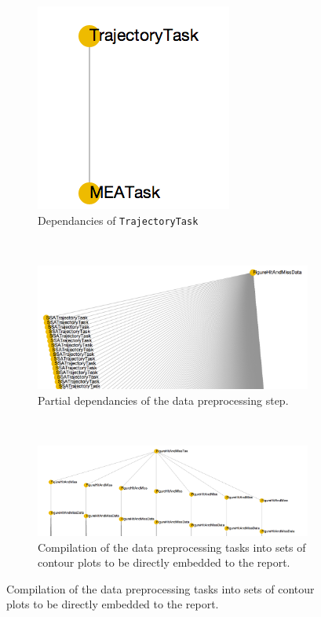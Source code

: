 \begin{figure}
    \centering
     \begin{subfigure}[t]{0.3\textwidth}
        \includegraphics[scale=0.7]{images/TrajectoryTask.png}
        \caption{Dependancies of {\tt TrajectoryTask}}
        \label{fig:pipes_example:TrajectoryTask}
    \end{subfigure}
    ~
    \begin{subfigure}[t]{\textwidth}
        \includegraphics[width=\textwidth]{images/FigureHitAndMissData}
        \caption{Partial dependancies of the data preprocessing step.}
        \label{fig:pipes_example:FigureHitAndMissData}
    \end{subfigure}
    ~
    \begin{subfigure}[t]{\textwidth}
        \includegraphics[width=\textwidth]{images/FigureHitAndMissTex.png}
        \caption{Compilation of the data preprocessing tasks into sets of contour plots to be directly embedded to the report.}

\end{subfigure}
\end{figure}
